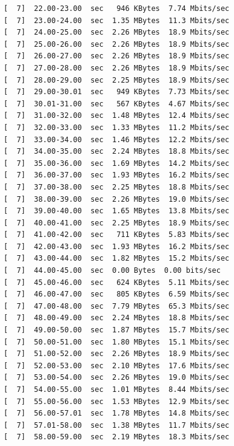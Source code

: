 \documentclass[12pt]{article}
\begin{document}
\begin{enumerate}
\begin{latin}
\begin{Verbatim}
[  7]  22.00-23.00  sec   946 KBytes  7.74 Mbits/sec                  
[  7]  23.00-24.00  sec  1.35 MBytes  11.3 Mbits/sec                  
[  7]  24.00-25.00  sec  2.26 MBytes  18.9 Mbits/sec                  
[  7]  25.00-26.00  sec  2.26 MBytes  18.9 Mbits/sec                  
[  7]  26.00-27.00  sec  2.26 MBytes  18.9 Mbits/sec                  
[  7]  27.00-28.00  sec  2.26 MBytes  18.9 Mbits/sec                  
[  7]  28.00-29.00  sec  2.25 MBytes  18.9 Mbits/sec                  
[  7]  29.00-30.01  sec   949 KBytes  7.73 Mbits/sec                  
[  7]  30.01-31.00  sec   567 KBytes  4.67 Mbits/sec                  
[  7]  31.00-32.00  sec  1.48 MBytes  12.4 Mbits/sec                  
[  7]  32.00-33.00  sec  1.33 MBytes  11.2 Mbits/sec                  
[  7]  33.00-34.00  sec  1.46 MBytes  12.2 Mbits/sec                  
[  7]  34.00-35.00  sec  2.24 MBytes  18.8 Mbits/sec                  
[  7]  35.00-36.00  sec  1.69 MBytes  14.2 Mbits/sec                  
[  7]  36.00-37.00  sec  1.93 MBytes  16.2 Mbits/sec                  
[  7]  37.00-38.00  sec  2.25 MBytes  18.8 Mbits/sec                  
[  7]  38.00-39.00  sec  2.26 MBytes  19.0 Mbits/sec                  
[  7]  39.00-40.00  sec  1.65 MBytes  13.8 Mbits/sec                  
[  7]  40.00-41.00  sec  2.25 MBytes  18.9 Mbits/sec                  
[  7]  41.00-42.00  sec   711 KBytes  5.83 Mbits/sec                  
[  7]  42.00-43.00  sec  1.93 MBytes  16.2 Mbits/sec                  
[  7]  43.00-44.00  sec  1.82 MBytes  15.2 Mbits/sec                  
[  7]  44.00-45.00  sec  0.00 Bytes  0.00 bits/sec                  
[  7]  45.00-46.00  sec   624 KBytes  5.11 Mbits/sec                  
[  7]  46.00-47.00  sec   805 KBytes  6.59 Mbits/sec                  
[  7]  47.00-48.00  sec  7.79 MBytes  65.3 Mbits/sec                  
[  7]  48.00-49.00  sec  2.24 MBytes  18.8 Mbits/sec                  
[  7]  49.00-50.00  sec  1.87 MBytes  15.7 Mbits/sec                  
[  7]  50.00-51.00  sec  1.80 MBytes  15.1 Mbits/sec                  
[  7]  51.00-52.00  sec  2.26 MBytes  18.9 Mbits/sec                  
[  7]  52.00-53.00  sec  2.10 MBytes  17.6 Mbits/sec                  
[  7]  53.00-54.00  sec  2.26 MBytes  19.0 Mbits/sec                  
[  7]  54.00-55.00  sec  1.01 MBytes  8.44 Mbits/sec                  
[  7]  55.00-56.00  sec  1.53 MBytes  12.9 Mbits/sec                  
[  7]  56.00-57.01  sec  1.78 MBytes  14.8 Mbits/sec                  
[  7]  57.01-58.00  sec  1.38 MBytes  11.7 Mbits/sec                  
[  7]  58.00-59.00  sec  2.19 MBytes  18.3 Mbits/sec                  

\end{Verbatim}
\end{latin}
\end{enumerate}
\end{document}
